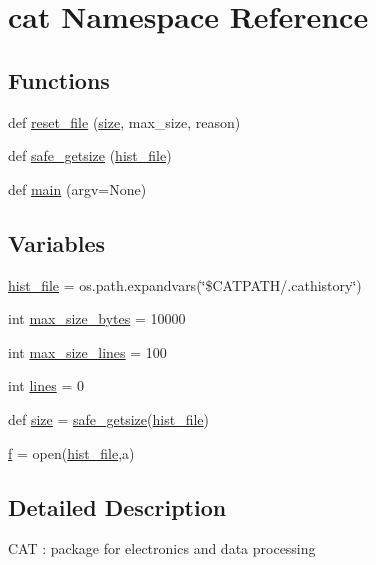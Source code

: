 \hypertarget{namespacecat}{}\section{cat Namespace Reference}
\label{namespacecat}
\subsection*{Functions}
\begin{DoxyCompactItemize}
\item 
def \hyperlink{namespacecat_ae0aa242aa488082b980de81f7a588f5e}{reset\+\_\+file} (\hyperlink{namespacecat_a3eae50bb86a614752045105e00365a46}{size}, max\+\_\+size, reason)
\item 
def \hyperlink{namespacecat_abd324a9da9ba2b9c5ae75515174616cd}{safe\+\_\+getsize} (\hyperlink{namespacecat_a5be1540f4d9418c1650b9bafbe8efa5a}{hist\+\_\+file})
\item 
def \hyperlink{namespacecat_a1d47acf33be14b333391a3a1478cf147}{main} (argv=None)
\end{DoxyCompactItemize}
\subsection*{Variables}
\begin{DoxyCompactItemize}
\item 
\hyperlink{namespacecat_a5be1540f4d9418c1650b9bafbe8efa5a}{hist\+\_\+file} = os.\+path.\+expandvars(\char`\"{}\$C\+A\+T\+P\+A\+TH/.cathistory\char`\"{})
\item 
int \hyperlink{namespacecat_ad56fd90da4261a3734b29a9a5e2d9a4e}{max\+\_\+size\+\_\+bytes} = 10000
\item 
int \hyperlink{namespacecat_a8e9446761b014effec3f2ec3748ae6c4}{max\+\_\+size\+\_\+lines} = 100
\item 
int \hyperlink{namespacecat_a0a8f4dfbf66e37f285191b2b6c7e2e0f}{lines} = 0
\item 
def \hyperlink{namespacecat_a3eae50bb86a614752045105e00365a46}{size} = \hyperlink{namespacecat_abd324a9da9ba2b9c5ae75515174616cd}{safe\+\_\+getsize}(\hyperlink{namespacecat_a5be1540f4d9418c1650b9bafbe8efa5a}{hist\+\_\+file})
\item 
\hyperlink{namespacecat_ac4e5e84140346d3c05a72261c63ef7b1}{f} = open(\hyperlink{namespacecat_a5be1540f4d9418c1650b9bafbe8efa5a}{hist\+\_\+file},\textquotesingle{}a\textquotesingle{})
\end{DoxyCompactItemize}


\subsection{Detailed Description}
\begin{DoxyVerb}CAT : package for electronics and data processing\end{DoxyVerb}
 

